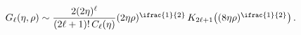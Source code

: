 $\mathop{G_{\ell}\/}\nolimits\!\left(\eta,\rho\right)\sim\dfrac{2(2\eta)^{\ell}%
}{(2\ell+1)!\mathop{C_{\ell}\/}\nolimits\!\left(\eta\right)}(2\eta\rho)^{%
\ifrac{1}{2}}\mathop{K_{2\ell+1}\/}\nolimits\!\left((8\eta\rho)^{\ifrac{1}{2}}%
\right).$